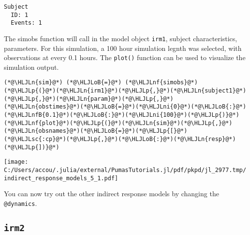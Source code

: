 \documentclass[12pt,a4paper]{article}
\newcommand{\HLJLn}[1]{#1}
\newcommand{\HLJLnf}[1]{\textcolor[RGB]{66,102,213}{#1}}
\newcommand{\HLJLsc}[1]{\textcolor[RGB]{201,61,57}{#1}}
\newcommand{\HLJLnfB}[1]{\textcolor[RGB]{59,151,46}{#1}}
\newcommand{\HLJLni}[1]{\textcolor[RGB]{59,151,46}{#1}}
\newcommand{\HLJLoB}[1]{\textcolor[RGB]{102,102,102}{\textbf{#1}}}
\newcommand{\HLJLp}[1]{#1}
\begin{document}
\begin{lstlisting}
Subject
  ID: 1
  Events: 1
\end{lstlisting}


The simobs function will call in the model object \texttt{irm1}, subject characteristics, parameters. For this simulation, a 100 hour simulation legnth was selected, with observations at every 0.1 hours. The \texttt{plot()} function can be used to visualize the simulation output.


\begin{lstlisting}
(*@\HLJLn{sim}@*) (*@\HLJLoB{=}@*) (*@\HLJLnf{simobs}@*)(*@\HLJLp{(}@*)(*@\HLJLn{irm1}@*)(*@\HLJLp{,}@*)(*@\HLJLn{subject1}@*)(*@\HLJLp{,}@*)(*@\HLJLn{param}@*)(*@\HLJLp{,}@*)(*@\HLJLn{obstimes}@*)(*@\HLJLoB{=}@*)(*@\HLJLni{0}@*)(*@\HLJLoB{:}@*)(*@\HLJLnfB{0.1}@*)(*@\HLJLoB{:}@*)(*@\HLJLni{100}@*)(*@\HLJLp{)}@*)
(*@\HLJLnf{plot}@*)(*@\HLJLp{(}@*)(*@\HLJLn{sim}@*)(*@\HLJLp{,}@*) (*@\HLJLn{obsnames}@*)(*@\HLJLoB{=}@*)(*@\HLJLp{[}@*)(*@\HLJLsc{:cp}@*)(*@\HLJLp{,}@*)(*@\HLJLoB{:}@*)(*@\HLJLn{resp}@*)(*@\HLJLp{])}@*)
\end{lstlisting}

\texttt{[image: C:/Users/accou/.julia/external/PumasTutorials.jl/pdf/pkpd/jl\_2977.tmp/indirect\_response\_models\_5\_1.pdf]}

You can now try out the other indirect response models by changing the \texttt{@dynamics}.

\subsection{\texttt{irm2}}
\end{document}
